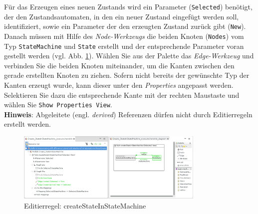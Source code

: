 Für das Erzeugen eines neuen Zustands wird ein Parameter (\texttt{Selected}) benötigt, der den Zustandsautomaten, in den ein neuer Zustand eingefügt werden soll, identifiziert, sowie ein Parameter der den erzeugten Zustand zurück gibt (\texttt{New}).\\
Danach müssen mit Hilfe des \textit{Node-Werkzeugs} die beiden Knoten (\texttt{Nodes}) vom Typ \texttt{StateMachine} und \texttt{State} erstellt und der entsprechende Parameter voran gestellt werden (vgl. Abb. \ref{silift-editrule_createStateInStateMachine}).
Wählen Sie aus der Palette das \textit{Edge-Werkzeug} und verbinden Sie die beiden Knoten miteinander, um die Kanten zwischen den gerade erstellten Knoten zu ziehen.
Sofern nicht bereits der gewünschte Typ der Kanten erzeugt wurde, kann dieser unter den \textit{Properties} angepasst werden. 
Selektieren Sie dazu die entsprechende Kante mit der rechten Maustaste und wählen Sie \texttt{Show Properties View}.\\

\textbf{Hinweis}: Abgeleitete (engl. \textit{derived}) Referenzen dürfen nicht durch Editierregeln erstellt werden.


\begin{figure}[H]
\centering
\includegraphics[width=0.8\textwidth]{editrules/graphics/silift-editrule_createStateInStateMachine.png}
\caption{Editierregel: createStateInStateMachine}
\label{silift-editrule_createStateInStateMachine}
\end{figure}

